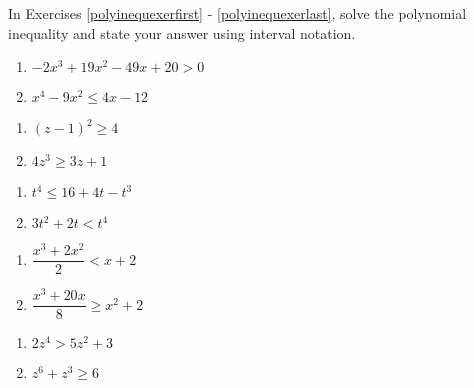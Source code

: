 \documentclass{ximera}
\begin{document}
In Exercises \ref{polyinequexerfirst} - \ref{polyinequexerlast}, solve the polynomial inequality and state your answer using interval notation.



\begin{multicols}{2}
\begin{enumerate}
\setcounter{enumi}{\value{HW}}

\item $-2x^{3} + 19x^{2} - 49x + 20 > 0$ \label{polyinequexerfirst}
\item $x^{4} - 9x^{2} \leq 4x - 12$

\setcounter{HW}{\value{enumi}}
\end{enumerate}
\end{multicols}

\begin{multicols}{2}
\begin{enumerate}
\setcounter{enumi}{\value{HW}}

\item $(z - 1)^{2} \geq 4$
\item $4z^3 \geq 3z+1$

\setcounter{HW}{\value{enumi}}
\end{enumerate}
\end{multicols}

\begin{multicols}{2}
\begin{enumerate}
\setcounter{enumi}{\value{HW}}

\item $t^4 \leq 16+4t-t^3$
\item $3t^2 + 2t < t^4$

\setcounter{HW}{\value{enumi}}
\end{enumerate}
\end{multicols}

\begin{multicols}{2}
\begin{enumerate}
\setcounter{enumi}{\value{HW}}

\item $\dfrac{x^3+2 x^2}{2} < x+2$
\item $\dfrac{x^3+20x}{8} \geq x^2 + 2$

\setcounter{HW}{\value{enumi}}
\end{enumerate}
\end{multicols}

\begin{multicols}{2}
\begin{enumerate}
\setcounter{enumi}{\value{HW}}

\item $2z^4>5z^2+3$
\item $z^6 + z^3 \geq 6$ \label{polyinequexerlast}

\setcounter{HW}{\value{enumi}}
\end{enumerate}
\end{multicols}
\end{document}
